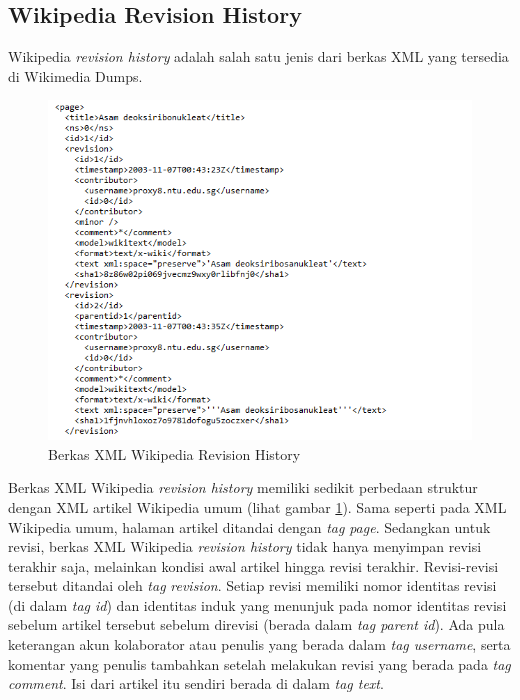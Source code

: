 \subsection{Wikipedia Revision History}
Wikipedia \textit{revision history} adalah salah satu jenis dari berkas XML yang tersedia di Wikimedia Dumps.
\begin{figure}
	\centering
	\includegraphics[width=1\linewidth]{pics/XMLWikipediaRevisionHistory}
	\caption{Berkas XML Wikipedia Revision History}
	\label{fig:wikirevisionhistory}
\end{figure}
\noindent Berkas XML Wikipedia \textit{revision history} memiliki sedikit perbedaan struktur dengan XML artikel Wikipedia umum (lihat gambar \ref{fig:wikirevisionhistory}). Sama seperti pada XML Wikipedia umum, halaman artikel ditandai dengan \textit{tag} \textit{page}. Sedangkan untuk revisi, berkas XML Wikipedia \textit{revision history} tidak hanya menyimpan revisi terakhir saja, melainkan kondisi awal artikel hingga revisi terakhir. Revisi-revisi tersebut ditandai oleh \textit{tag} \textit{revision}. Setiap revisi memiliki nomor identitas revisi (di dalam \textit{tag id}) dan identitas induk yang menunjuk pada nomor identitas revisi sebelum artikel tersebut sebelum direvisi (berada dalam \textit{tag parent id}). Ada pula keterangan akun kolaborator atau penulis yang berada dalam \textit{tag username}, serta komentar yang penulis tambahkan setelah melakukan revisi yang berada pada \textit{tag comment}. Isi dari artikel itu sendiri berada di dalam \textit{tag text}.

